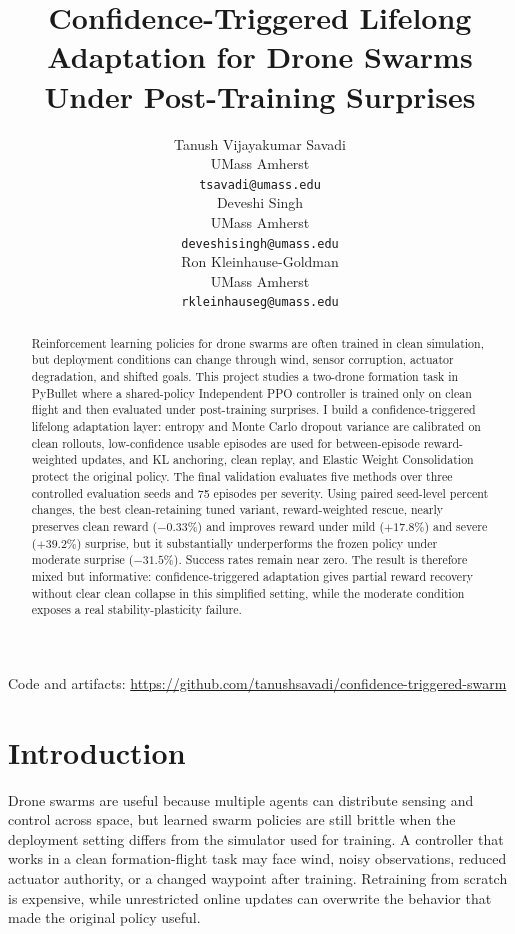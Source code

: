 \documentclass{article}
\title{Confidence-Triggered Lifelong Adaptation for Drone Swarms Under Post-Training Surprises}
\author{%
  Tanush Vijayakumar Savadi \\
  UMass Amherst \\
  \texttt{tsavadi@umass.edu} \\
  \And
  Deveshi Singh \\
  UMass Amherst \\
  \texttt{deveshisingh@umass.edu} \\
  \And
  Ron Kleinhause-Goldman \\
  UMass Amherst \\
  \texttt{rkleinhauseg@umass.edu} \\
}
\begin{document}
\maketitle

\begin{center}
\small Code and artifacts: \url{https://github.com/tanushsavadi/confidence-triggered-swarm}
\end{center}

\begin{abstract}
Reinforcement learning policies for drone swarms are often trained in clean simulation, but deployment conditions can change through wind, sensor corruption, actuator degradation, and shifted goals. This project studies a two-drone formation task in PyBullet where a shared-policy Independent PPO controller is trained only on clean flight and then evaluated under post-training surprises. I build a confidence-triggered lifelong adaptation layer: entropy and Monte Carlo dropout variance are calibrated on clean rollouts, low-confidence usable episodes are used for between-episode reward-weighted updates, and KL anchoring, clean replay, and Elastic Weight Consolidation protect the original policy. The final validation evaluates five methods over three controlled evaluation seeds and 75 episodes per severity. Using paired seed-level percent changes, the best clean-retaining tuned variant, reward-weighted rescue, nearly preserves clean reward ($-0.33\%$) and improves reward under mild ($+17.8\%$) and severe ($+39.2\%$) surprise, but it substantially underperforms the frozen policy under moderate surprise ($-31.5\%$). Success rates remain near zero. The result is therefore mixed but informative: confidence-triggered adaptation gives partial reward recovery without clear clean collapse in this simplified setting, while the moderate condition exposes a real stability-plasticity failure.
\end{abstract}

\section{Introduction}

Drone swarms are useful because multiple agents can distribute sensing and control across space, but learned swarm policies are still brittle when the deployment setting differs from the simulator used for training. A controller that works in a clean formation-flight task may face wind, noisy observations, reduced actuator authority, or a changed waypoint after training. Retraining from scratch is expensive, while unrestricted online updates can overwrite the behavior that made the original policy useful.
\end{document}
